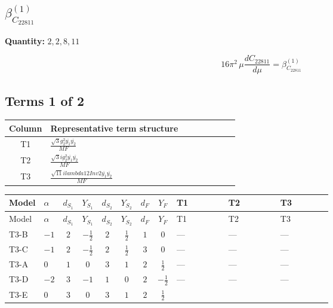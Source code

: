 \documentclass[8pt]{article}
\begin{document}
\begin{landscape}
\section*{$\beta_{C_{22811}}^{(1)}$}
\noindent\textbf{Quantity: }$\mathrm{2,2,8,11}$\par\smallskip
\[16\pi^2\,\mu\frac{d C_{22811}}{d\mu}=\beta_{C_{22811}}^{(1)}\]
\subsection*{Terms 1 of 2}
\begin{center}
\begin{tabular}{@{}c >{\raggedright\arraybackslash}p{0.82\linewidth}@{}}
\toprule
Column & Representative term structure \\
\midrule
T1 & \(\displaystyle \frac{\sqrt{3} g_{2}^{2} \overline{y_{1}} \overline{y_{2}}}{MF}\) \\
\midrule
T2 & \(\displaystyle \frac{\sqrt{3} i g_{2}^{2} \overline{y_{1}} \overline{y_{2}}}{MF}\) \\
\midrule
T3 & \(\displaystyle \frac{\sqrt{11} i lambda12Inv2 \overline{y_{1}} \overline{y_{2}}}{MF}\) \\
\midrule
\bottomrule
\end{tabular}
\end{center}
\smallskip
\tiny
\begin{longtable}{@{}llcccccc >{\raggedright\arraybackslash}p{0.21\linewidth} >{\raggedright\arraybackslash}p{0.21\linewidth} >{\raggedright\arraybackslash}p{0.21\linewidth}@{}}
\toprule
Model & $\alpha$ & $d_{S_1}$ & $Y_{S_1}$ & $d_{S_2}$ & $Y_{S_2}$ & $d_F$ & $Y_F$ & T1 & T2 & T3 \\
\midrule
\endfirsthead
\toprule
Model & $\alpha$ & $d_{S_1}$ & $Y_{S_1}$ & $d_{S_2}$ & $Y_{S_2}$ & $d_F$ & $Y_F$ & T1 & T2 & T3 \\
\midrule
\endhead
T3-B & $-1$ & $2$ & $-\frac{1}{2}$ & $2$ & $\frac{1}{2}$ & $1$ & $0$ & --- & --- & --- \\
\midrule
T3-C & $-1$ & $2$ & $-\frac{1}{2}$ & $2$ & $\frac{1}{2}$ & $3$ & $0$ & --- & --- & --- \\
\midrule
T3-A & $0$ & $1$ & $0$ & $3$ & $1$ & $2$ & $\frac{1}{2}$ & --- & --- & --- \\
\midrule
T3-D & $-2$ & $3$ & $-1$ & $1$ & $0$ & $2$ & $-\frac{1}{2}$ & --- & --- & --- \\
\midrule
T3-E & $0$ & $3$ & $0$ & $3$ & $1$ & $2$ & $\frac{1}{2}$ & \scriptsize\adjustbox{max width=\linewidth}{$\begin{gathered} - \frac{\sqrt{3} g_{2}^{2} \overline{y_{1}} \overline{y_{2}}}{6 MF}\end{gathered}$} & \scriptsize\adjustbox{max width=\linewidth}{$\begin{gathered} - \frac{11 \sqrt{3} i g_{2}^{2} \overline{y_{1}} \overline{y_{2}}}{8 MF}\end{gathered}$} & \scriptsize\adjustbox{max width=\linewidth}{$\begin{gathered} - \frac{3 \sqrt{11} i lambda12Inv2 \overline{y_{1}} \overline{y_{2}}}{22 MF}\end{gathered}$} \\

\end{longtable}
\end{landscape}
\end{document}
